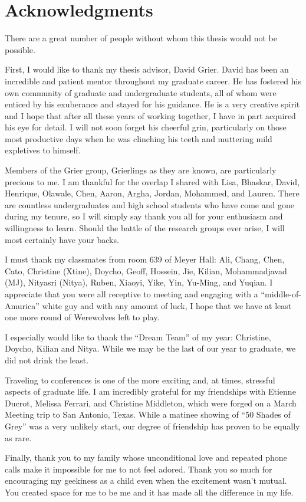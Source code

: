 \chapter*{Acknowledgments}
\label{ch:acknowledgments}

There are a great number of people without whom this thesis
would not be possible.

First, I would like to thank my thesis advisor, David Grier. David has been
an incredible and patient mentor throughout my graduate career.
He has fostered his own community of graduate and undergraduate
students, all of whom were enticed by his exuberance and stayed for
his guidance. He is a very creative spirit and I hope that after
all these years of working together, I have in part acquired his eye for detail.
I will not soon forget his cheerful grin, particularly on those
most productive days when he was clinching his teeth and muttering
mild expletives to himself.

Members of the Grier group, Grierlings as they are known, are
particularly precious to me. I am thankful for the overlap I shared
with Lisa, Bhaskar, David, Henrique, Olawale, Chen, Aaron,
Argha, Jordan, Mohammed, and Lauren. There are countless
undergraduates and high school students who have come
and gone during my tenure, so I will simply say thank you all for
your enthusiasm and willingness to learn. Should the battle of the
research groups ever arise, I will most certainly have your backs.

I must thank my classmates from room 639 of Meyer Hall:
Ali, Chang, Chen, Cato, Christine (Xtine), Doycho, Geoff, Hossein,
Jie, Kilian, Mohammadjavad (MJ), Nityasri (Nitya), Ruben, Xiaoyi,
Yike, Yin, Yu-Ming, and Yuqian. I appreciate that you were all
receptive to meeting and engaging with a ``middle-of-Amurica''
white guy and with any amount of luck, I hope that we have at least one
more round of Werewolves left to play.

I especially would like to thank the ``Dream Team'' of my year:
Christine, Doycho, Kilian and Nitya. While we may be the last of our
year to graduate, we did not drink the least.

Traveling to conferences is one of the more exciting and, at
times, stressful aspects of graduate life. I am incredibly grateful
for my friendships with Etienne Ducrot, Melissa Ferrari, and Christine
Middleton, which were forged on a March Meeting trip
to San Antonio, Texas. While a matinee showing of ``50 Shades of Grey''
was a very unlikely start, our degree of friendship has proven to
be equally as rare.

Finally, thank you to my family whose unconditional love and repeated
phone calls make it impossible for me to not feel adored. Thank you so
much for encouraging my geekiness as a child even when the excitement
wasn't mutual. You created space for me to be me and it has made all
the difference in my life.
